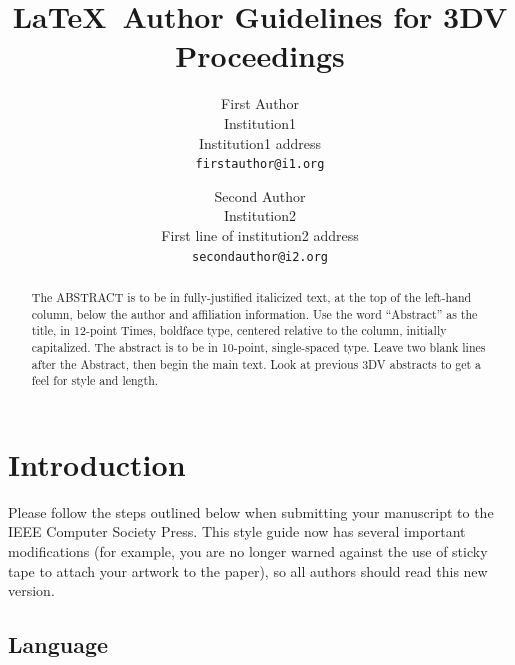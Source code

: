 \documentclass[10pt,twocolumn,letterpaper]{article}
\begin{document}
\title{\LaTeX\ Author Guidelines for 3DV Proceedings}

\author{First Author\\
Institution1\\
Institution1 address\\
{\tt\small firstauthor@i1.org}
\and
Second Author\\
Institution2\\
First line of institution2 address\\
{\tt\small secondauthor@i2.org}
}

\maketitle

\begin{abstract}
   The ABSTRACT is to be in fully-justified italicized text, at the top
   of the left-hand column, below the author and affiliation
   information. Use the word ``Abstract'' as the title, in 12-point
   Times, boldface type, centered relative to the column, initially
   capitalized. The abstract is to be in 10-point, single-spaced type.
   Leave two blank lines after the Abstract, then begin the main text.
   Look at previous 3DV  abstracts to get a feel for style and length.
\end{abstract}

\section{Introduction}

Please follow the steps outlined below when submitting your manuscript to
the IEEE Computer Society Press.  This style guide now has several
important modifications (for example, you are no longer warned against the
use of sticky tape to attach your artwork to the paper), so all authors
should read this new version.

\subsection{Language}
\end{document}
